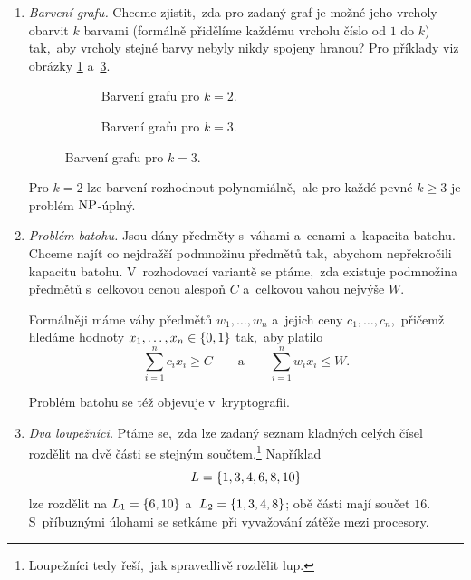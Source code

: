 \begin{enumerate}[label=(\roman*)]
    \item \textit{Barvení grafu.} Chceme zjistit,~zda pro zadaný graf je možné jeho vrcholy obarvit $k$ barvami (formálně přidělíme každému vrcholu číslo od $1$ do $k$) tak,~aby vrcholy stejné barvy nebyly nikdy spojeny hranou? Pro příklady viz obrázky \ref{subfig:barveni_grafu1} a~\ref{subfig:barveni_grafu2}.
    \begin{figure}[ht]
        \centering
        \begin{subfigure}{7cm}
            \centering
            
            \caption{Barvení grafu pro $k=2$.}
            \label{subfig:barveni_grafu1}
        \end{subfigure}
        \qquad
        \begin{subfigure}{7cm}
            \centering
            
            \caption{Barvení grafu pro $k=3$.}
            \label{subfig:barveni_grafu2}
        \end{subfigure}
    \end{figure}
    Pro $k=2$ lze barvení rozhodnout polynomiálně,~ale pro každé pevné $k\geqslant3$ je problém \ensuremath{\classNP}-úplný.
    \item \textit{Problém batohu.} Jsou dány předměty s~váhami a~cenami a~kapacita batohu. Chceme najít co nejdražší podmnožinu předmětů tak,~abychom nepřekročili kapacitu batohu. V~rozhodovací variantě se ptáme,~zda existuje podmnožina předmětů s~celkovou cenou alespoň $C$ a~celkovou vahou nejvýše $W$.
    
    Formálněji máme váhy předmětů $w_1,\dots,w_n$ a~jejich ceny $c_1,\dots,c_n$,~přičemž hledáme hodnoty $x_1,\dots,x_n\in\left\{0,1\right\}$ tak,~aby platilo
    \[\sum_{i=1}^{n}c_ix_i\geqslant C\qquad\text{a}\qquad\sum_{i=1}^{n}w_ix_i\leqslant W.\]

    Problém batohu se též objevuje v~kryptografii.
    \item \textit{Dva loupežníci.} Ptáme se,~zda lze zadaný seznam kladných celých čísel rozdělit na dvě části se stejným součtem.\footnote{Loupežníci tedy řeší,~jak spravedlivě rozdělit lup.} Například
    \[L=\left\{1,3,4,6,8,10\right\}\]
    lze rozdělit na $L_1=\left\{6,10\right\}$ a~$L_2=\left\{1,3,4,8\right\}$; obě části mají součet $16$. S~příbuznými úlohami se setkáme při vyvažování zátěže mezi procesory.
\end{enumerate}

